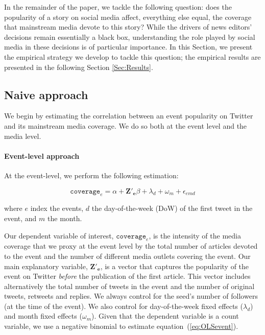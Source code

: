 In the remainder of the paper, we tackle the following question: does the popularity of a story on social media affect, everything else equal, the coverage that mainstream media devote to this story? While the drivers of news editors' decisions remain essentially a black box, understanding the role played by social media in these decisions is of particular importance. In this Section, we present the empirical strategy we develop to tackle this question; the empirical results are presented in the following Section \ref{Sec:Results}.


\subsection{Naive approach\label{Sec:SpecificationOLS}}

We begin by estimating the correlation between an event popularity on Twitter and its mainstream media coverage. We do so both at the event level and the media level.


\paragraph{Event-level approach}

At the event-level, we perform the following estimation:

\begin{equation}
\mathtt{coverage}_{e}= \alpha + \mathbf{Z'_{e}}\beta + \lambda_d + \omega_m + \epsilon_{emd}
\label{eq:OLSevent}
\end{equation}

\noindent  where $e$ index the events, $d$ the day-of-the-week (DoW) of the first tweet in the event, and $m$ the month.

Our dependent variable of interest, $\mathtt{coverage}_{e}$, is the intensity of the media coverage that we proxy at the event level by the total number of articles devoted to the event and the number of different media outlets covering the event. Our main explanatory variable, $\mathbf{Z'_{e}}$, is a  vector that captures the popularity of the event on Twitter \textit{before} the publication of the first article. This vector includes alternatively the total number of tweets in the event and the number of original tweets, retweets and replies. We always control for the seed's number of followers (at the time of the event). We also control for day-of-the-week fixed effects ($\lambda_d$) and month fixed effects ($\omega_m$). Given that the dependent variable is a count variable, we use a negative binomial to estimate equation~(\ref{eq:OLSevent}).


